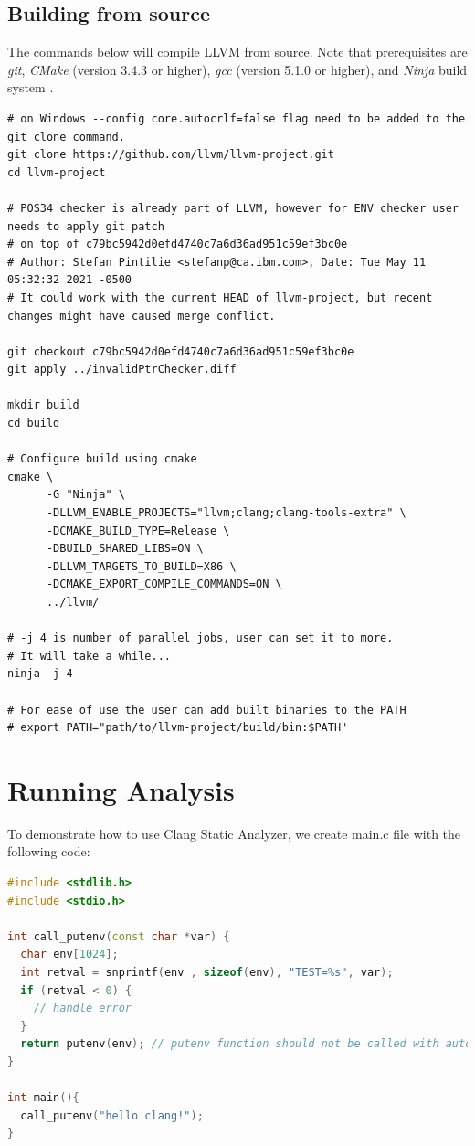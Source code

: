 \subsection{Building from source}


The commands below will compile LLVM from source. Note that prerequisites are \emph{git}, \emph{CMake} (version 3.4.3 or higher), \emph{gcc} (version 5.1.0 or higher), and \emph{Ninja} build system \cite{ninja}.

\begin{lstlisting}[caption={},label={lst:llvm-build1}]
# on Windows --config core.autocrlf=false flag need to be added to the git clone command.
git clone https://github.com/llvm/llvm-project.git
cd llvm-project

# POS34 checker is already part of LLVM, however for ENV checker user needs to apply git patch
# on top of c79bc5942d0efd4740c7a6d36ad951c59ef3bc0e
# Author: Stefan Pintilie <stefanp@ca.ibm.com>, Date: Tue May 11 05:32:32 2021 -0500
# It could work with the current HEAD of llvm-project, but recent changes might have caused merge conflict.

git checkout c79bc5942d0efd4740c7a6d36ad951c59ef3bc0e
git apply ../invalidPtrChecker.diff

mkdir build
cd build

# Configure build using cmake
cmake \
      -G "Ninja" \
      -DLLVM_ENABLE_PROJECTS="llvm;clang;clang-tools-extra" \
      -DCMAKE_BUILD_TYPE=Release \
      -DBUILD_SHARED_LIBS=ON \
      -DLLVM_TARGETS_TO_BUILD=X86 \
      -DCMAKE_EXPORT_COMPILE_COMMANDS=ON \
      ../llvm/

# -j 4 is number of parallel jobs, user can set it to more.
# It will take a while...
ninja -j 4

# For ease of use the user can add built binaries to the PATH
# export PATH="path/to/llvm-project/build/bin:$PATH"
\end{lstlisting}


\section{Running Analysis} \label{run-analysis}
To demonstrate how to use Clang Static Analyzer, we create main.c file with the following code:

\lstset{caption={}, label=src:trial_run}
\begin{lstlisting}[language={C++}]
#include <stdlib.h>
#include <stdio.h>

int call_putenv(const char *var) {
  char env[1024];
  int retval = snprintf(env , sizeof(env), "TEST=%s", var);
  if (retval < 0) {
    // handle error
  }
  return putenv(env); // putenv function should not be called with auto variables
}

int main(){
  call_putenv("hello clang!");
}
\end{lstlisting}

